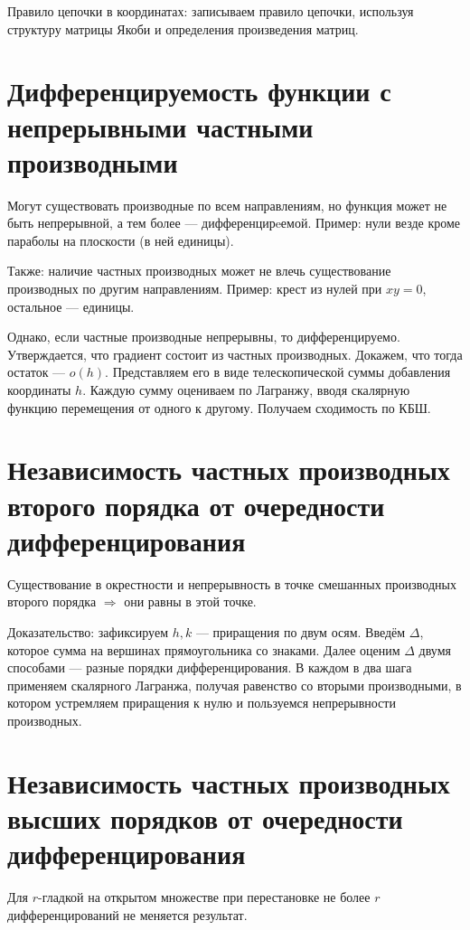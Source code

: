\documentclass[12pt, a4paper]{article}
\begin{document}
Правило цепочки в координатах: записываем правило цепочки, используя структуру матрицы Якоби и определения произведения матриц.


\section{Дифференцируемость функции с непрерывными частными производными}

    Могут существовать производные по всем направлениям, но функция может не быть непрерывной, а тем более — дифференцирeемой.
    Пример: нули везде кроме параболы на плоскости (в ней единицы).

    Также: наличие частных производных может не влечь существование производных по другим направлениям.
    Пример: крест из нулей при $xy = 0$, остальное — единицы.

    \splitdoc
    Однако, если частные производные непрерывны, то дифференцируемо.
    Утверждается, что градиент состоит из частных производных. Докажем, что тогда остаток — $o(h)$.
    Представляем его в виде телескопической суммы добавления координаты $h$.
    Каждую сумму оцениваем по Лагранжу, вводя скалярную функцию перемещения от одного к другому. 
    Получаем сходимость по КБШ.

\section{Независимость частных производных второго порядка от очередности дифференцирования}

    Существование в окрестности и непрерывность в точке смешанных производных второго порядка $\Rightarrow$ они равны в этой точке.
    
    Доказательство: зафиксируем $h, k$ — приращения по двум осям. Введём $\Delta$, 
    которое сумма на вершинах прямоугольника со знаками. 
    Далее оценим $\Delta$ двумя способами — разные порядки дифференцирования. 
    В каждом в два шага применяем скалярного Лагранжа, получая равенство со вторыми производными, 
    в котором устремляем приращения к нулю и пользуемся непрерывности производных.

\section{Независимость частных производных высших порядков от очередности дифференцирования}

    Для $r$-гладкой на открытом множестве при перестановке не более $r$ дифференцирований не меняется результат.
\end{document}
